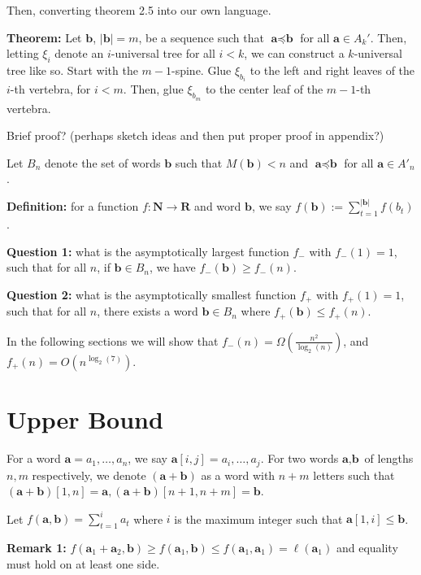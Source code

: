 \documentclass{article}
\begin{document}
Then, converting theorem 2.5 into our own language. 

\textbf{Theorem:} Let $\textbf{b}$, $|\textbf{b}|=m$, be a sequence such that $\textbf{a}\preceq \textbf{b}$ for all $\textbf{a} \in A_k'$. Then, letting $\xi_i$ denote an $i$-universal tree for all $i<k$, we can construct a $k$-universal tree like so. Start with the $m-1$-spine. Glue $\xi_{b_i}$ to the left and right leaves of the $i$-th vertebra, for $i < m$. Then, glue $\xi_{b_m}$ to the center leaf of the $m-1$-th vertebra.


Brief proof? (perhaps sketch ideas and then put proper proof in appendix?)


Let $B_n$ denote the set of words $\textbf{b}$ such that $M(\textbf{b})<n$ and $\textbf{a}\preceq \textbf{b}$ for all $\textbf{a} \in A'_n$.


\textbf{Definition:} for a function $f: \textbf{N}\to \textbf{R}$ and word $\textbf{b}$, we say $f(\textbf{b}):= \sum_{t=1}^{|\textbf{b}|} f(b_t)$.

\textbf{Question 1:} what is the asymptotically largest function $f_-$ with $f_-(1) =1$, such that for all $n$, if $\textbf{b}\in B_n$, we have $f_-(\textbf{b}) \ge  f_-(n)$.

\textbf{Question 2:} what is the asymptotically smallest function $f_+$ with $f_+(1) = 1$, such that for all $n$, there exists a word $\textbf{b}\in B_n$ where $f_+(\textbf{b}) \le  f_+(n)$.

In the following sections we will show that $f_-(n) = \Omega\left(\frac{n^2}{\log_2(n)}\right)$, and $f_+(n) = O(n^{\log_2(7)})$.


\section{Upper Bound}

For a word $\textbf{a} = a_1,\dots ,a_n$, we say $\textbf{a}[i,j] = a_i,\dots, a_j$. For two words $\textbf{a},\textbf{b}$ of lengths $n,m$ respectively, we denote $(\textbf{a}+\textbf{b})$ as a word with $n+m$ letters such that $(\textbf{a}+\textbf{b})[1,n] = \textbf{a}, (\textbf{a}+\textbf{b})[n+1,n+m] = \textbf{b}$.

Let $f(\textbf{a},\textbf{b}) = \sum_{t=1}^i a_t$ where $i$ is the maximum integer such that $\textbf{a}[1,i] \le \textbf{b}$.

\textbf{Remark 1:} $f(\textbf{a}_1+\textbf{a}_2,\textbf{b}) \ge f(\textbf{a}_1,\textbf{b})\le f(\textbf{a}_1,\textbf{a}_1) = \ell(\textbf{a}_1)$ and equality must hold on at least one side.
\end{document}
